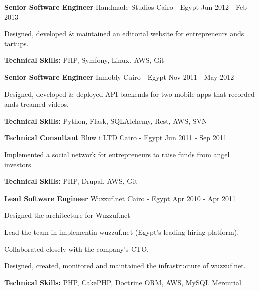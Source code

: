 \begin{cventries}
  \cventry
    {\textbf{Senior Software Engineer}} %
    {Handmade Studios} %
    {Cairo - Egypt} %
    {Jun 2012 - Feb 2013} %
    {
      \begin{cvitems} %
        \item {Designed, developed \& maintained an editorial website for entrepreneurs ands tartups.}
        \item {\textbf{Technical Skills:} PHP, Symfony, Linux, AWS, Git}
      \end{cvitems}
    }


  \cventry
    {\textbf{Senior Software Engineer}} %
    {Inmobly} %
    {Cairo - Egypt} %
    {Nov 2011 - May 2012} %
    {
      \begin{cvitems} %
        \item {Designed, developed \& deployed API backends for two mobile apps that recorded ands treamed videos.}
        \item {\textbf{Technical Skills:} Python, Flask, SQLAlchemy, Rest, AWS, SVN}
      \end{cvitems}
    }

  \cventry
    {\textbf{Technical Consultant}} %
    {Bluw i LTD} %
    {Cairo - Egypt} %
    {Jun 2011 - Sep 2011} %
    {
      \begin{cvitems} %
        \item {Implemented a social network for entrepreneurs to raise funds from angel investors.}
        \item {\textbf{Technical Skills:} PHP, Drupal, AWS, Git}
      \end{cvitems}
    }

  \cventry
    {\textbf{Lead Software Engineer}} %
    {Wuzzuf.net} %
    {Cairo - Egypt} %
    {Apr 2010 - Apr 2011} %
    {
      \begin{cvitems} %
      \item {Designed the architecture for Wuzzuf.net}
      \item {Lead the team in implementin wuzzuf.net (Egypt’s leading hiring platform).}
        \item {Collaborated closely with the company’s CTO.}
        \item {Designed, created, monitored and maintained the infrastructure of wuzzuf.net.}
        \item {\textbf{Technical Skills:} PHP, CakePHP, Doctrine ORM, AWS, MySQL Mercurial}
      \end{cvitems}
    }


\end{cventries}
